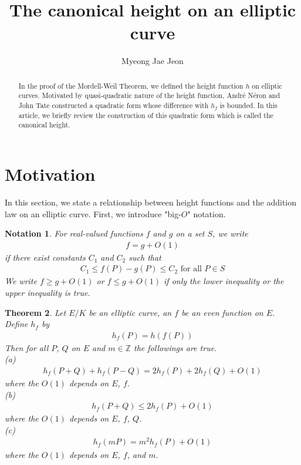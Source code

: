 \documentclass[11pt]{article}
\title{The canonical height on an elliptic curve}
\author{Myeong Jae Jeon}
\date{}
\newcommand{\<}{\langle}
\renewcommand{\>}{\rangle}
\numberwithin{equation}{section}
\theoremstyle{plain}
\newtheorem{thm}{Theorem}[section]
\newtheorem{Notation}[thm]{Notation}
\theoremstyle{definition}
\begin{document}
\maketitle

\begin{abstract}
 In the proof of the Mordell-Weil Theorem, we defined the height function \(h\) on elliptic curves. Motivated by quasi-quadratic nature of the height function, Andr\'e N\'eron and John Tate constructed a quadratic form whose difference with \(h_f\) is bounded. In this article, we briefly review the construction of this quadratic form which is called the canonical height.
\end{abstract}

\section{Motivation} \label{section-H}

    In this section, we state a relationship between height functions and the addition law on an elliptic curve. First, we introduce "big-\(O\)" notation.
    
    \begin{Notation}
        For real-valued functions \(f\) and \(g\) on a set \(S\), we write 
        \begin{align*}
            f = g + O(1)
        \end{align*}
        if there exist constants \(C_1\) and \(C_2\) such that 
        \begin{align*}
            C_1 \le f(P) - g(P) \le C_2 \text{   for all } P \in S
        \end{align*}
        We write \(f \ge g + O(1)\) or \(f \le g + O(1) \) if only the lower inequality or the upper inequality is true.
    \end{Notation}
    
    \begin{thm}
        Let \(E/K\) be an elliptic curve, an \(f\) be an even function on \(E\). Define \(h_f\) by
        \begin{align*}
            h_f(P) = h(f(P))
        \end{align*}
        Then for all \(P\), \(Q\) on \(E\) and \(m \in \mathbb{Z}\) the followings are true. \\
        (a)
        \begin{align*}
           h_f(P+Q) + h_f(P-Q) = 2h_f(P) + 2h_f(Q) + O(1) 
        \end{align*}
        \quad where the \(O(1)\) depends on \(E\), \(f\). \\
        (b)
        \begin{align*}
         h_f(P+Q) \le 2h_f(P) + O(1) 
        \end{align*}
        \quad where the \(O(1)\) depends on \(E\), \(f\), \(Q\). \\
        (c)
        \begin{align*}
            h_f(mP) = m^2 h_f(P) + O(1) 
        \end{align*}
        \quad where the \(O(1)\) depends on \(E\), \(f\), and \(m\).
    \end{thm}
    
\end{document}
